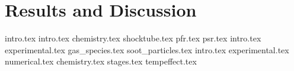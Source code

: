\chapter{Results and Discussion}
{intro.tex}
{intro.tex}
{chemistry.tex}
{shocktube.tex}
{pfr.tex}
{psr.tex}
{intro.tex}
{experimental.tex}
{gas_species.tex}
{soot_particles.tex}
{intro.tex}
{experimental.tex}
{numerical.tex}
{chemistry.tex}
{stages.tex}
{tempeffect.tex}

